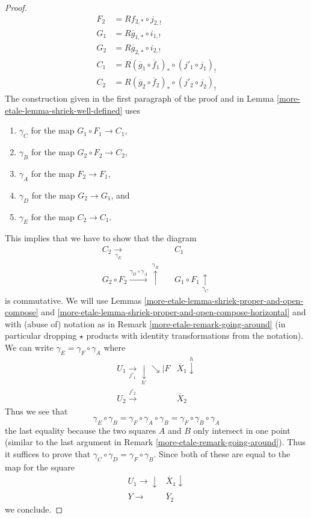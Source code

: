 \begin{proof}
\begin{align*}
F_2 & = Rf_{2, *} \circ j_{2, !} \\
G_1 & = R\overline{g}_{1, *} \circ i_{1, !} \\
G_2 & = R\overline{g}_{2, *} \circ i_{2, !} \\
C_1 & = R(\overline{g}_1 \circ \overline{f}_1)_* \circ (j'_1 \circ j_1)_! \\
C_2 & = R(\overline{g}_2 \circ \overline{f}_2)_* \circ (j'_2 \circ j_2)_!
\end{align*}
The construction given in the first paragraph of the proof
and in Lemma \ref{more-etale-lemma-shriek-well-defined} uses
\begin{enumerate}
\item $\gamma_C$ for the map $G_1 \circ F_1 \to C_1$,
\item $\gamma_B$ for the map $G_2 \circ F_2 \to C_2 $,
\item $\gamma_A$ for the map $F_2 \to F_1$,
\item $\gamma_D$ for the map $G_2 \to G_1$, and
\item $\gamma_E$ for the map $C_2 \to C_1$.
\end{enumerate}
This implies that we have to show that the diagram
$$
\begin{array}{ccc}C_2 \underset{\gamma_E}{\longrightarrow} &  & C_1 \\ G_2 \circ F_2 \overset{\gamma_D \circ \gamma_A}{\longrightarrow}\overset{\gamma_B}{\uparrow} &  & G_1 \circ F_1 \underset{\gamma_C}{\uparrow}\end{array}
$$
is commutative. We will use
Lemmas \ref{more-etale-lemma-shriek-proper-and-open-compose} and
\ref{more-etale-lemma-shriek-proper-and-open-compose-horizontal}
and with (abuse of) notation as in
Remark \ref{more-etale-remark-going-around} (in particular
dropping $\star$ products with identity transformations
from the notation).
We can write $\gamma_E = \gamma_F \circ \gamma_A$ where
$$
\begin{array}{cc}U_1 \underset{j'_1}{\longrightarrow}\underset{h'}{\downarrow}\searrow|F & \overline{X}_1 \overset{h}{\downarrow} \\ U_2 \overset{j'_2}{\longrightarrow} & \overline{X}_2\end{array}
$$
Thus we see that
$$
\gamma_E \circ \gamma_B = \gamma_F \circ \gamma_A  \circ \gamma_B
= \gamma_F \circ \gamma_B \circ \gamma_A
$$
the last equality because the two squares $A$ and $B$ only
intersect in one point (similar to the last argument in
Remark \ref{more-etale-remark-going-around}). Thus it suffices to prove that
$\gamma_C \circ \gamma_D = \gamma_F \circ \gamma_B$.
Since both of these are equal to the map for the square
$$
\begin{array}{cc}U_1 \longrightarrow\downarrow & \overline{X}_1 \downarrow \\ Y \longrightarrow & \overline{Y}_2\end{array}
$$
we conclude.
\end{proof}

